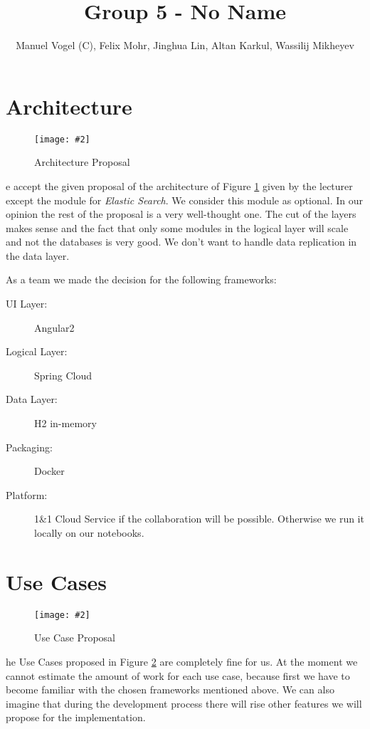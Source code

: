 \documentclass[]{article}
\title{Group 5 - \textbf{No Name}}
\author{Manuel Vogel (C), Felix Mohr,  Jinghua Lin,  Altan Karkul, Wassilij Mikheyev}
\newcommand{\cgraphic}[4]
{
	\begin{figure}[htb]
		\begin{center}
		\texttt{[image: \#2]}
		\end{center}
		\caption{#3}
		\label{fig:#2}
	\end{figure}
}%
\begin{document}
	
	\maketitle	

	\section{Architecture}
	\cgraphic{.17}{architecture_proposal}{Architecture Proposal}
	We accept the given proposal of the architecture of Figure \ref{fig:architecture_proposal} given by the lecturer except the module for \textit{Elastic Search}. We consider this module as optional. In our opinion the rest of the proposal is a very well-thought one. The cut of the layers makes sense and the fact that only some modules in the logical layer will scale and not the databases is very good. We don't want to handle data replication in the data layer. 
	
	As a team we made the decision for the following frameworks:
	\begin{description}
		\item[UI Layer:] Angular2
		\item[Logical Layer:] Spring Cloud
		\item[Data Layer:] H2 in-memory
		\item[Packaging:] Docker
		\item[Platform:] 1\&1 Cloud Service if the collaboration will be possible. Otherwise we run it locally on our notebooks.
	\end{description}

	\section{Use Cases}
	\cgraphic{.16}{use_cases_proposal}{Use Case Proposal}
	The Use Cases proposed in Figure \ref{fig:use_cases_proposal} are completely fine for us. At the moment we cannot estimate the amount of work for each use case, because first we have to become familiar with the chosen frameworks mentioned above. We can also imagine that during the development process there will rise other features we will propose for the implementation.
	
\end{document}
